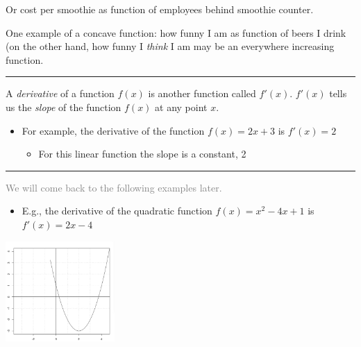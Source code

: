 \documentclass[]{article}
\providecommand{\tightlist}{%
  \setlength{\itemsep}{0pt}\setlength{\parskip}{0pt}}
\begin{document}
Or cost per smoothie as function of employees behind smoothie counter.

One example of a concave function: how funny I am as function of beers I drink (on the other hand, how funny I \emph{think} I am may be an everywhere increasing function.

\begin{center}\rule{0.5\linewidth}{\linethickness}\end{center}

\begin{description}
\tightlist
\item[Derivative of a function]
A \emph{derivative} of a function \(f(x)\) is another function called \(f'(x)\). \(f'(x)\) tells us the \emph{slope} of the function \(f(x)\) at any point \(x\).
\end{description}

\begin{itemize}
\tightlist
\item
  For example, the derivative of the function \(f(x) = 2x + 3\) is \(f'(x) = 2\)

  \begin{itemize}
  \tightlist
  \item
    For this linear function the slope is a constant, 2
  \end{itemize}
\end{itemize}

\begin{center}\rule{0.5\linewidth}{\linethickness}\end{center}

\textcolor{grey}{We will come back to the following examples later.}

\begin{itemize}
\tightlist
\item
  E.g., the derivative of the quadratic function \(f(x) = x^2 -4x + 1\) is \(f'(x) = 2x - 4\)
\end{itemize}

\bigskip

\includegraphics[height=1.5in]{picsfigs/plotaquadfncnR.png}
\end{document}
